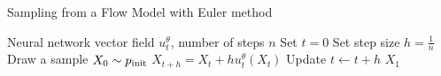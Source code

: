 \begin{algorithm}[h]
\caption{Sampling from a Flow Model with Euler method}
\label{alg:sampling_flow_model}
\begin{algorithmic}[1]
\REQUIRE Neural network vector field $u_t^\theta$, number of steps $n$
\STATE Set $t=0$
\STATE Set step size $h=\frac{1}{n}$
\STATE Draw a sample $X_0\sim p_{\rm{init}}$
    \STATE $X_{t+h} = X_{t} + h u_t^\theta(X_t)$
    \STATE Update $t\leftarrow t+h$
\ENDFOR
\RETURN $X_1$
\end{algorithmic}
\end{algorithm}




